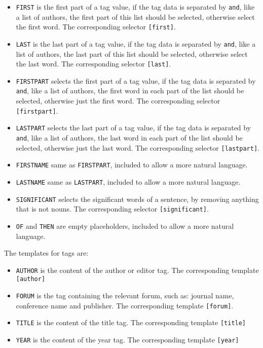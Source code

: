 \begin{itemize}
\item \texttt{FIRST} is the first part of a tag value, if the tag data
  is separated by \texttt{and}, like a list of authors, the first part
  of this list should be selected, otherwise select the first word.
  The corresponding selector \texttt{[first]}.
\item \texttt{LAST} is the last part of a tag value, if the tag data
  is separated by \texttt{and}, like a list of authors, the last part
  of this list should be selected, otherwise select the last word.
  The corresponding selector \texttt{[last]}.
\item \texttt{FIRSTPART} selects the first part of a tag value, if the
  tag data is separated by \texttt{and}, like a list of authors, the
  first word in each part of the list should be selected, otherwise
  just the first word.  The corresponding selector
  \texttt{[firstpart]}.
\item \texttt{LASTPART} selects the last part of a tag value, if the
  tag data is separated by \texttt{and}, like a list of authors, the
  last word in each part of the list should be selected, otherwise
  just the last word.  The corresponding selector \texttt{[lastpart]}.
\item \texttt{FIRSTNAME} same as \texttt{FIRSTPART}, included to allow
  a more natural language.
\item \texttt{LASTNAME} same as \texttt{LASTPART}, included to allow
  a more natural language.
\item \texttt{SIGNIFICANT} selects the significant words of a
  sentence, by removing anything that is not nouns.  The
  corresponding selector \texttt{[significant]}.  
\item \texttt{OF} and \texttt{THEN} are empty placeholders, included
  to allow a more natural language.
\end{itemize}

The templates for tags are:

\begin{itemize}
\item \texttt{AUTHOR} is the content of the author or editor tag.  The
  corresponding template \texttt{[author]}
\item \texttt{FORUM} is the tag containing the relevant forum, such
  as: journal name, conference name and publisher.  The corresponding
  template \texttt{[forum]}.
\item \texttt{TITLE} is the content of the title tag.  The
  corresponding template \texttt{[title]}
\item \texttt{YEAR} is the content of the year tag.  The corresponding
  template \texttt{[year]}
\end{itemize}

